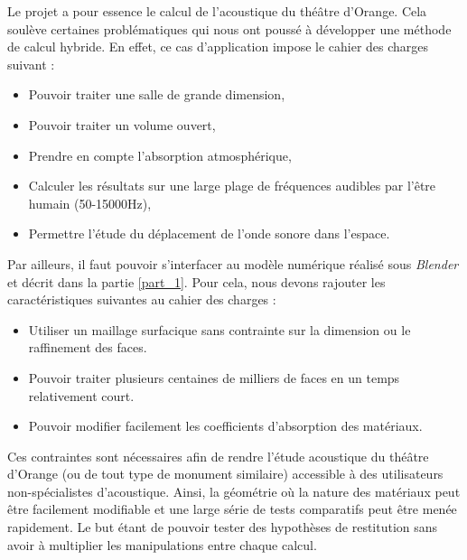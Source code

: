 \label{sect_methodecouplee}
Le projet a pour essence le calcul de l'acoustique du théâtre d'Orange. Cela soulève certaines problématiques qui nous ont poussé à développer une méthode de calcul hybride. En effet, ce cas d'application impose le cahier des charges suivant :
\begin{itemize}
	\item Pouvoir traiter une salle de grande dimension,
	\item Pouvoir traiter un volume ouvert,
	\item Prendre en compte l'absorption atmosphérique,
	\item Calculer les résultats sur une large plage de fréquences audibles par l'être humain (50-15000Hz),
	\item Permettre l'étude du déplacement de l'onde sonore dans l'espace.
\end{itemize}
Par ailleurs, il faut pouvoir s'interfacer au modèle numérique réalisé sous \textit{Blender} et décrit dans la partie \ref{part_1}. Pour cela, nous devons rajouter les caractéristiques suivantes au cahier des charges :

\begin{itemize}
	\item Utiliser un maillage surfacique sans contrainte sur la dimension ou le raffinement des faces.
	\item Pouvoir traiter plusieurs centaines de milliers de faces en un temps relativement court.
	\item Pouvoir modifier facilement les coefficients d'absorption des matériaux.
\end{itemize}

Ces contraintes sont nécessaires afin de rendre l'étude acoustique du théâtre d'Orange (ou de tout type de monument similaire) accessible à des utilisateurs non-spécialistes d'acoustique. Ainsi, la géométrie où la nature des matériaux peut être facilement modifiable et une large série de tests comparatifs peut être menée rapidement. Le but étant de pouvoir tester des hypothèses de restitution sans avoir à multiplier les manipulations entre chaque calcul.


